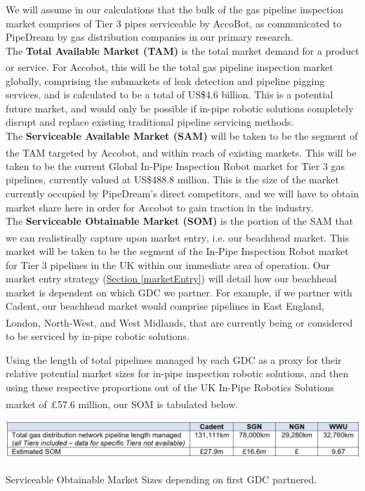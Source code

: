\documentclass[11pt]{article}		%
\newcommand{\supercite}[1]{\textsuperscript{\cite{#1}}}		%
\newcommand{\sectref}[1]{\hyperref[#1]{Section \ref*{#1}}}     %
\begin{document}
    We will assume in our calculations that the bulk of the gas pipeline inspection market comprises of Tier 3 pipes serviceable by AccoBot, as communicated to PipeDream by gas distribution companies in our primary research. \\ 
    The \textbf{Total Available Market (TAM)} is the total market demand for a product or service\supercite{2g_robotics}. For Accobot, this will be the total gas pipeline inspection market globally, comprising the submarkets of leak detection and pipeline pigging services, and is calculated to be a total of US\$4.6 billion. This is a potential future market, and would only be possible if in-pipe robotic solutions completely disrupt and replace existing traditional pipeline servicing methods. \\
    The \textbf{Serviceable Available Market (SAM) }will be taken to be the segment of the TAM targeted by Accobot, and within reach of existing markets\supercite{2g_robotics}. This will be taken to be the current Global In-Pipe Inspection Robot market for Tier 3 gas pipelines, currently valued at US\$488.8 million.  This is the size of the market currently occupied by PipeDream’s direct competitors, and we will have to obtain market share here in order for Accobot to gain traction in the industry.\\
    The \textbf{Serviceable Obtainable Market (SOM)} is the portion of the SAM that we can realistically capture upon market entry\supercite{2g_robotics}, i.e. our beachhead market. This market will be taken to be the segment of the In-Pipe Inspection Robot market for Tier 3 pipelines in the UK within our immediate area of operation. Our market entry strategy (\sectref{marketEntry}) will detail how our beachhead market is dependent on which GDC we partner. For example, if we partner with Cadent, our beachhead market would comprise pipelines in East England, London, North-West, and West Midlands\supercite{2g_robotics}, that are currently being or considered to be serviced by in-pipe robotic solutions. 
    
    Using the length of total pipelines managed by each GDC as a proxy for their relative potential market sizes for in-pipe inspection robotic solutions, and then using these respective proportions out of the UK In-Pipe Robotics Solutions market of £57.6 million\supercite{2g_robotics}, our SOM is tabulated below. 
		\begin{table}[h]
			\centering
			\includegraphics[width=\textwidth]{SOM.jpg}
			\caption{Serviceable Obtainable Market Sizes depending on first GDC partnered\supercite{ltd}.}
			\label{SOM}
 		\end{table}
 	\vspace{-0.5cm}
    
\end{document}
